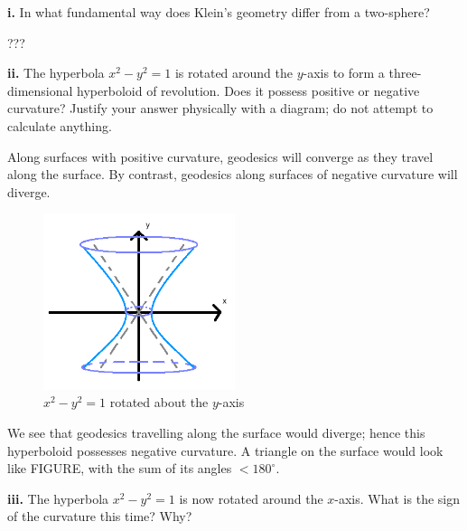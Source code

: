 \documentclass[a4paper]{article} %
\begin{document}
\begin{framed}
\textbf{i.} In what fundamental way does Klein's geometry differ from a two-sphere?
\end{framed}

???


\begin{framed}
\textbf{ii.} The hyperbola $x^2-y^2=1$ is rotated around the $y$-axis to form a three-dimensional hyperboloid of revolution. Does it possess positive or negative curvature? Justify your answer physically with a diagram; do not attempt to calculate anything.
\end{framed}

Along surfaces with positive curvature, geodesics will converge as they travel along the surface. By contrast, geodesics along surfaces of negative curvature will diverge.

\begin{figure}[h]
\centering
\includegraphics[width=0.5\textwidth]{images/dii.png}
\caption{$x^2-y^2=1$ rotated about the $y$-axis}
\label{dii figure}
\end{figure}

We see that geodesics travelling along the surface would diverge; hence this hyperboloid possesses negative curvature. A triangle on the surface would look like FIGURE, with the sum of its angles $< 180^{\circ}$.


\begin{framed}
\textbf{iii.} The hyperbola $x^2-y^2=1$ is now rotated around the $x$-axis. What is the sign of the curvature this time? Why?
\end{framed}
\end{document}
